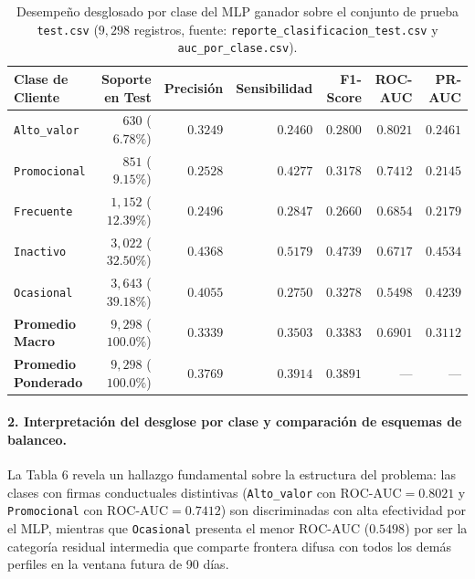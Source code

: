 \documentclass[11pt,a4paper]{article}
\newcommand{\code}[1]{\texttt{\small #1}}
\begin{document}
\begin{table}[H]
\centering
\caption{Desempeño desglosado por clase del MLP ganador sobre el conjunto de prueba \code{test.csv} ($9{,}298$ registros, fuente: \code{reporte\_clasificacion\_test.csv} y \code{auc\_por\_clase.csv}).}
\footnotesize
\setlength{\tabcolsep}{4pt}
\begin{tabularx}{\textwidth}{>{\raggedright\arraybackslash}X rrrrrr}
\toprule
\textbf{Clase de Cliente} & \textbf{Soporte en Test} & \textbf{Precisión} & \textbf{Sensibilidad} & \textbf{F1-Score} & \textbf{ROC-AUC} & \textbf{PR-AUC} \\
\midrule
\code{Alto\_valor} &   $630$ ($6.78\%$)  & $0.3249$ & $0.2460$ & $0.2800$ & $\mathbf{0.8021}$ & $0.2461$ \\
\code{Promocional} &   $851$ ($9.15\%$)  & $0.2528$ & $0.4277$ & $0.3178$ & $\mathbf{0.7412}$ & $0.2145$ \\
\code{Frecuente}   & $1{,}152$ ($12.39\%$) & $0.2496$ & $0.2847$ & $0.2660$ & $0.6854$ & $0.2179$ \\
\code{Inactivo}    & $3{,}022$ ($32.50\%$) & $0.4368$ & $0.5179$ & $\mathbf{0.4739}$ & $0.6717$ & $0.4534$ \\
\code{Ocasional}   & $3{,}643$ ($39.18\%$) & $0.4055$ & $0.2750$ & $0.3278$ & $0.5498$ & $0.4239$ \\
\midrule
\textbf{Promedio Macro} & $9{,}298$ ($100.0\%$) & $\mathbf{0.3339}$ & $\mathbf{0.3503}$ & $\mathbf{0.3383}$ & $\mathbf{0.6901}$ & $\mathbf{0.3112}$ \\
\textbf{Promedio Ponderado} & $9{,}298$ ($100.0\%$) & $\mathbf{0.3769}$ & $\mathbf{0.3914}$ & $\mathbf{0.3891}$ & --- & --- \\
\bottomrule
\end{tabularx}
\end{table}

\paragraph{2. Interpretación del desglose por clase y comparación de esquemas de balanceo.}
La Tabla 6 revela un hallazgo fundamental sobre la estructura del problema: las clases con firmas conductuales distintivas (\code{Alto\_valor} con $\text{ROC-AUC} = 0.8021$ y \code{Promocional} con $\text{ROC-AUC} = 0.7412$) son discriminadas con alta efectividad por el MLP, mientras que \code{Ocasional} presenta el menor $\text{ROC-AUC}$ ($0.5498$) por ser la categoría residual intermedia que comparte frontera difusa con todos los demás perfiles en la ventana futura de 90 días.
\end{document}
